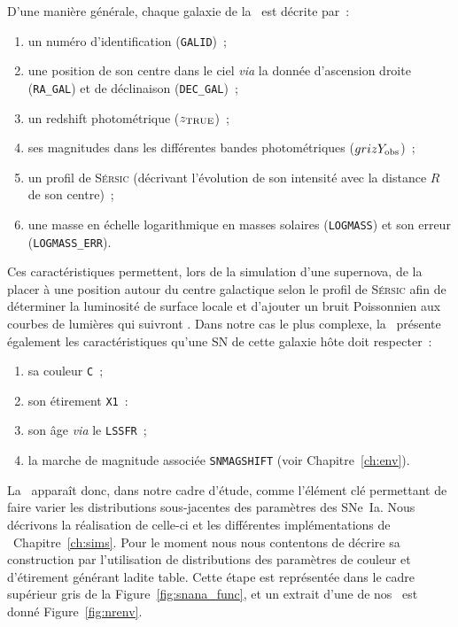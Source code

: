 \documentclass[../main/main.tex]{subfiles}
\begin{document}
D'une manière générale, chaque galaxie de la \hostlib\ est décrite par~:
\begin{enumerate}
    \item un numéro d'identification (\texttt{GALID})~;
    \item une position de son centre dans le ciel \textit{via} la donnée
        d'ascension droite (\texttt{RA\_GAL}) et de déclinaison
        (\texttt{DEC\_GAL})~;
    \item un redshift photométrique ($z_{\rm TRUE}$)~;
    \item ses magnitudes dans les différentes bandes photométriques ($grizY_{\rm
        obs}$)~;
    \item un profil de \textsc{Sérsic} (décrivant l'évolution de son intensité
        avec la distance $R$ de son centre)~;
    \item une masse en échelle logarithmique en masses solaires
        (\texttt{LOGMASS}) et son erreur (\texttt{LOGMASS\_ERR}).
\end{enumerate}
Ces caractéristiques permettent, lors de la simulation d'une supernova, de la
placer à une position autour du centre galactique selon le profil de
\textsc{Sérsic} afin de déterminer la luminosité de surface locale et d'ajouter
un bruit Poissonnien aux courbes de lumières qui suivront \citep{kessler2019}.
Dans notre cas le plus complexe, la \hostlib\ présente également les
caractéristiques qu'une SN de cette galaxie hôte doit respecter~:
\begin{enumerate}[resume]
    \item sa couleur \texttt{C}~;
    \item son étirement \texttt{X1}~:
    \item son âge \textit{via} le \texttt{LSSFR}~;
    \item la marche de magnitude associée \texttt{SNMAGSHIFT} (voir
        Chapitre~\ref{ch:env}).
\end{enumerate}
La \hostlib\ apparaît donc, dans notre cadre d'étude, comme l'élément clé
permettant de faire varier les distributions sous-jacentes des paramètres des
SNe~Ia. Nous décrivons la réalisation de celle-ci et les différentes
implémentations de \hostlib\ Chapitre~\ref{ch:sims}. Pour le moment nous nous
contentons de décrire sa construction par l'utilisation de distributions des
paramètres de couleur et d'étirement générant ladite table. Cette étape est
représentée dans le cadre supérieur gris de la Figure~\ref{fig:snana_func}, et
un extrait d'une de nos \hostlib\ est donné Figure~\ref{fig:nrenv}.
\end{document}
